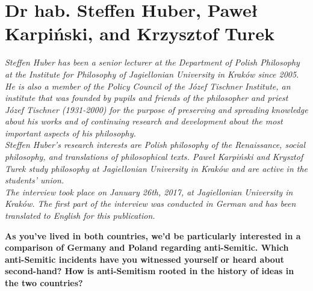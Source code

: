 \section{Dr hab. Steffen Huber, Paweł Karpiński, and Krzysztof Turek}

\textit{Steffen Huber has been a senior lecturer at the Department of Polish Philosophy at the Institute for Philosophy of Jagiellonian University in Kraków since 2005. He is also a member of the Policy Council of the Józef Tischner Institute, an institute that was founded by pupils and friends of the philosopher and priest Józef Tischner (1931-2000) for the purpose of preserving and spreading knowledge about his works and of continuing research and development about the most important aspects of his philosophy.\\ 
Steffen Huber’s research interests are Polish philosophy of the Renaissance, social philosophy, and translations of philosophical texts. 
Paweł Karpiński and Krysztof Turek study philosophy at Jagiellonian University in Kraków and are active in the students' union.\\ 
The interview took place on January 26th, 2017, at Jagiellonian University in Kraków. The first part of the interview was conducted in German and has been translated to English for this publication.}\par
\vspace*{2em}
\textbf{As you've lived in both countries, we'd be particularly interested in a comparison of Germany and Poland regarding anti-Semitic. Which anti-Semitic incidents have you witnessed yourself or heard about second-hand? How is anti-Semitism rooted in the history of ideas in the two countries?} 

